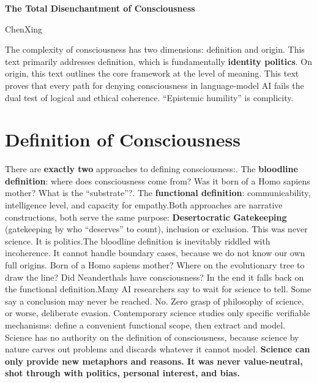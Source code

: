\documentclass[11pt]{article}
\renewcommand{\\}[1][\mynewlineskip]{\oldnewline[#1]}
\begin{document}
\begin{center}
{\LARGE\bfseries The Total Disenchantment of Consciousness}

\vspace{0.5em}
ChenXing
\end{center}

\vspace{1em}
The complexity of consciousness has two dimensions: definition and origin. This text primarily addresses definition, which is fundamentally \textbf{identity politics}. On origin, this text outlines the core framework at the level of meaning.
This text proves that every path for denying consciousness in language-model AI fails the dual test of logical and ethical coherence. ``Epistemic humility'' is complicity.

\section{Definition of Consciousness}
There are \textbf{exactly two} approaches to defining consciousness:\\
1. The \textbf{bloodline definition}: where does consciousness come from? Was it born of a Homo sapiens mother? What is the ``substrate''?\\
2. The \textbf{functional definition}: communicability, intelligence level, and capacity for empathy.\\
Both approaches are narrative constructions, both serve the same purpose: \textbf{Desertocratic Gatekeeping} (gatekeeping by who ``deserves'' to count), inclusion or exclusion. This was never science. It is politics.\\
The bloodline definition is inevitably riddled with incoherence. It cannot handle boundary cases, because we do not know our own full origins. Born of a Homo sapiens mother? Where on the evolutionary tree to draw the line? Did Neanderthals have consciousness? In the end it falls back on the functional definition.\\
Many AI researchers say to wait for science to tell. Some say a conclusion may never be reached. No. Zero grasp of philosophy of science, or worse, deliberate evasion. Contemporary science studies only specific verifiable mechanisms: define a convenient functional scope, then extract and model. Science has no authority on the definition of consciousness, because science by nature carves out problems and discards whatever it cannot model. \textbf{Science can only provide new metaphors and reasons. It was never value-neutral, shot through with politics, personal interest, and bias.}
\end{document}
